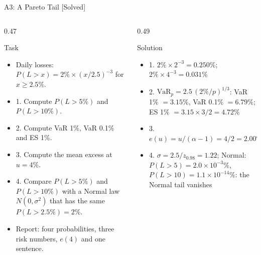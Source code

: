 \begin{frame}{A3: A Pareto Tail [Solved]}
\itemsize{\scriptsize}
\begin{columns}[T]
\begin{column}{0.47\textwidth}
\begin{block}{Task}
\begin{itemize}
    \item Daily losses: $P(L > x) = 2\% \times (x/2.5)^{-3}$ for $x \ge 2.5\%$.
    \item 1. Compute $P(L > 5\%)$ and $P(L > 10\%)$.
    \item 2. Compute VaR 1\%, VaR 0.1\% and ES 1\%.
    \item 3. Compute the mean excess at $u = 4\%$.
    \item 4. Compare $P(L > 5\%)$ and $P(L > 10\%)$ with a Normal law $N(0, \sigma^2)$ that has the same $P(L > 2.5\%) = 2\%$.
    \item Report: four probabilities, three risk numbers, $e(4)$ and one sentence.
\end{itemize}
\end{block}
\end{column}
\begin{column}{0.49\textwidth}
\begin{exampleblock}{Solution}
\begin{itemize}
    \item 1. $2\% \times 2^{-3} = 0.250\%$; $2\% \times 4^{-3} = 0.031\%$
    \item 2. $\mathrm{VaR}_p = 2.5\,(2\%/p)^{1/3}$: VaR 1\% $= 3.15\%$, VaR 0.1\% $= 6.79\%$; ES 1\% $= 3.15 \times 3/2 = 4.72\%$
    \item 3. $e(u) = u/(\alpha - 1) = 4/2 = 2.00\%$
    \item 4. $\sigma = 2.5/z_{0.98} = 1.22$; Normal: $P(L > 5) = 2.0\times 10^{-3}\%$, $P(L > 10) = 1.1\times 10^{-14}\%$: the Normal tail vanishes
\end{itemize}
\end{exampleblock}
\end{column}
\end{columns}
\end{frame}

